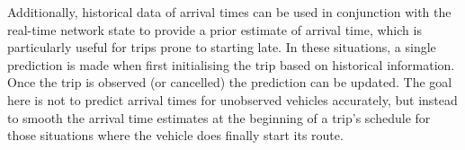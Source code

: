 Additionally, historical data of arrival times can be used in conjunction with the real-time network state to provide a prior estimate of arrival time, which is particularly useful for trips prone to starting late. In these situations, a single prediction is made when first initialising the trip based on historical information. Once the trip is observed (or cancelled) the prediction can be updated. The goal here is not to predict arrival times for unobserved vehicles accurately, but instead to smooth the arrival time estimates at the beginning of a trip's schedule for those situations where the vehicle does finally start its route.
